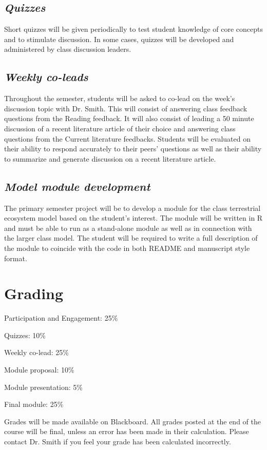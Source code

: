 \documentclass[12pt, notitlepage]{article}   	%
\begin{document}
{\subsection{\textit{Quizzes}}
Short quizzes will be given periodically to test student knowledge of core concepts and to
stimulate discussion. In some cases, quizzes will be developed and administered
by class discussion leaders.

\subsection{\textit{Weekly co-leads}}
Throughout the semester, students will be asked to co-lead on the week's discussion
topic with Dr. Smith. This will consist of answering class feedback questions from the
Reading feedback. It will also consist of leading a 50 minute discussion of a recent literature article
of their choice and answering class questions from the Current literature feedbacks.
Students will be evaluated on their ability to respond accurately to their peers' questions
as well as their ability to summarize and generate discussion on a recent literature article.

\subsection{\textit{Model module development}}
The primary semester project will be to develop a module for the class terrestrial ecosystem
model based on the student's interest. The module will be written in R and must be able to
run as a stand-alone module as well as in connection with the larger class model.
The student will be required to write a full description of the module to coincide with the
code in both README and manuscript style format.

\newpage

\section{Grading}
Participation and Engagement: 25\% \par
Quizzes: 10\% \par
Weekly co-lead: 25\% \par
Module proposal: 10\% \par
Module presentation: 5\% \par
Final module: 25\% \par

Grades will be made available on Blackboard. 
All grades posted at the end of the course will be final, 
unless an error has been made in their calculation.
Please contact Dr. Smith if you feel your grade has been calculated incorrectly.

}
\end{document}
